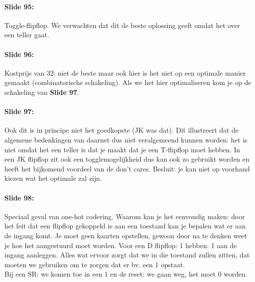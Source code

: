\documentclass[10pt,a4paper]{book}
\begin{document}
\paragraph{Slide 95:} Toggle-flipflop. We verwachten dat dit de beste oplossing geeft omdat het over een teller gaat. 

\paragraph{Slide 96:} Kostprijs van 32: niet de beste maar ook hier is het niet op een optimale manier gemaakt (combinatorische schakeling). Als we het hier optimaliseren kom je op de schakeling van \textbf{Slide 97}.

\paragraph{Slide 97:} Ook dit is in principe niet het goedkopste (JK was dat). Dit illustreert dat de algemene bedenkingen van daarnet dus niet veralgemeend kunnen worden: het is niet omdat het een teller is dat je maakt dat je een T-flipflop moet hebben. In een JK flipflop zit ook een togglemogelijkheid dus kan ook zo gebruikt worden en heeft het bijkomend voordeel van de don't cares. Besluit: je kan niet op voorhand kiezen wat het optimale zal zijn.

\paragraph{Slide 98:} Speciaal geval van one-hot codering. Waarom kan je het eenvoudig maken: door het feit dat een flipflop gekoppeld is aan een toestand kan je bepalen wat er aan de ingang komt. Je moet geen kaarten opstellen, gewoon door na te denken weet je hoe het aangestuurd moet worden. Voor een D flipflop: 1 hebben: 1 aan de ingang aanleggen. Alles wat ervoor zorgt dat we in die toestand zullen zitten, dat moeten we gebruiken om te zorgen dat er bv. een 1 opstaat.\\
Bij een SR: we komen toe in een 1 en de reset: we gaan weg, het moet 0 worden.
\end{document}
